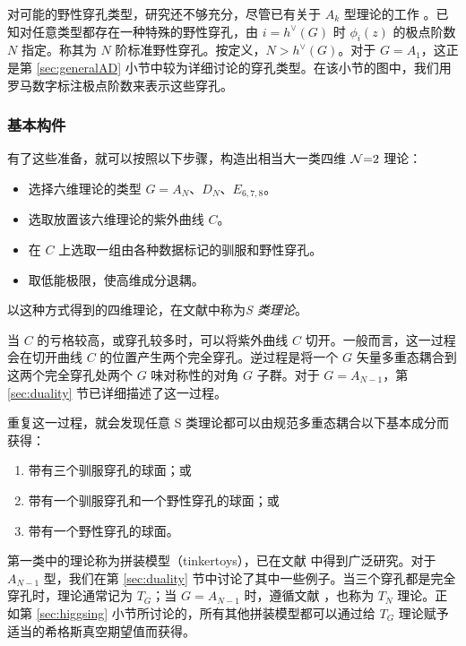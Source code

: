 对可能的野性穿孔类型，研究还不够充分，尽管已有关于 $A_k$ 型理论的工作 \cite{Xie:2012hs}。已知对任意类型都存在一种特殊的野性穿孔，由 $i=h^\vee(G)$ 时 $\phi_i(z)$ 的极点阶数 $N$ 指定。称其为 $N$ 阶标准野性穿孔。按定义，$N>h^\vee(G)$。对于 $G=A_1$，这正是第 \ref{sec:generalAD} 小节中较为详细讨论的穿孔类型。在该小节的图中，我们用罗马数字标注极点阶数来表示这些穿孔。

\subsubsection{基本构件}
有了这些准备，就可以按照以下步骤，构造出相当大一类四维 $\mathcal{N}{=}2$ 理论：
\begin{itemize}
\item 选择六维理论的类型 $G=A_N$、$D_N$、$E_{6,7,8}$。
\item 选取放置该六维理论的紫外曲线 $C$。
\item 在 $C$ 上选取一组由各种数据标记的驯服和野性穿孔。
\item 取低能极限，使高维成分退耦。
\end{itemize}
以这种方式得到的四维理论，在文献中称为\emph{S 类理论}。

当 $C$ 的亏格较高，或穿孔较多时，可以将紫外曲线 $C$ 切开。一般而言，这一过程会在切开曲线 $C$ 的位置产生两个完全穿孔。逆过程是将一个 $G$ 矢量多重态耦合到这两个完全穿孔处两个 $G$ 味对称性的对角 $G$ 子群。对于 $G=A_{N-1}$，第 \ref{sec:duality} 节已详细描述了这一过程。

重复这一过程，就会发现任意 S 类理论都可以由规范多重态耦合以下基本成分而获得：
\begin{enumerate}
\item 带有三个驯服穿孔的球面；或
\item 带有一个驯服穿孔和一个野性穿孔的球面；或
\item 带有一个野性穿孔的球面。
\end{enumerate}
第一类中的理论称为拼装模型（tinkertoys），已在文献 \cite{Chacaltana:2010ks,Chacaltana:2011ze,Chacaltana:2012ch,Chacaltana:2013oka} 中得到广泛研究。对于 $A_{N-1}$ 型，我们在第 \ref{sec:duality} 节中讨论了其中一些例子。当三个穿孔都是完全穿孔时，理论通常记为 $T_G$；当 $G=A_{N-1}$ 时，遵循文献 \cite{Gaiotto:2009we}，也称为 $T_N$ 理论。正如第 \ref{sec:higgsing} 小节所讨论的，所有其他拼装模型都可以通过给 $T_G$ 理论赋予适当的希格斯真空期望值而获得。

